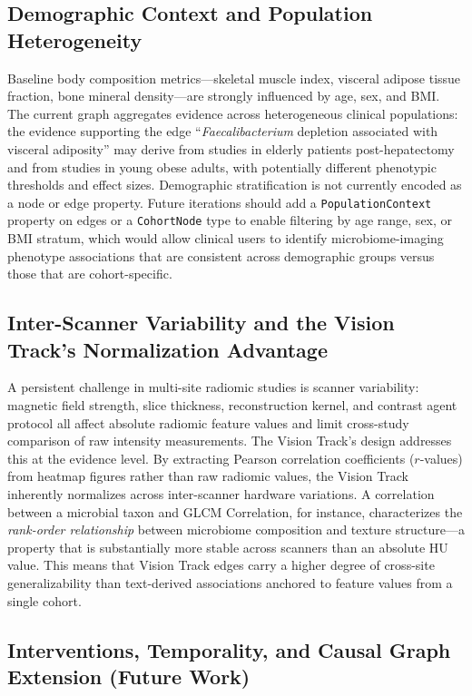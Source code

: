 \documentclass[12pt, letterpaper]{article}
\begin{document}
\subsection{Demographic Context and Population Heterogeneity}

Baseline body composition metrics—skeletal muscle index, visceral adipose tissue fraction, bone mineral density—are strongly influenced by age, sex, and BMI. The current graph aggregates evidence across heterogeneous clinical populations: the evidence supporting the edge ``\textit{Faecalibacterium} depletion associated with visceral adiposity'' may derive from studies in elderly patients post-hepatectomy and from studies in young obese adults, with potentially different phenotypic thresholds and effect sizes. Demographic stratification is not currently encoded as a node or edge property. Future iterations should add a \texttt{PopulationContext} property on edges or a \texttt{CohortNode} type to enable filtering by age range, sex, or BMI stratum, which would allow clinical users to identify microbiome-imaging phenotype associations that are consistent across demographic groups versus those that are cohort-specific.

\subsection{Inter-Scanner Variability and the Vision Track's Normalization Advantage}

A persistent challenge in multi-site radiomic studies is scanner variability: magnetic field strength, slice thickness, reconstruction kernel, and contrast agent protocol all affect absolute radiomic feature values and limit cross-study comparison of raw intensity measurements. The Vision Track's design addresses this at the evidence level. By extracting Pearson correlation coefficients ($r$-values) from heatmap figures rather than raw radiomic values, the Vision Track inherently normalizes across inter-scanner hardware variations. A correlation between a microbial taxon and GLCM Correlation, for instance, characterizes the \textit{rank-order relationship} between microbiome composition and texture structure---a property that is substantially more stable across scanners than an absolute HU value. This means that Vision Track edges carry a higher degree of cross-site generalizability than text-derived associations anchored to feature values from a single cohort.

\subsection{Interventions, Temporality, and Causal Graph Extension (Future Work)}
\end{document}
